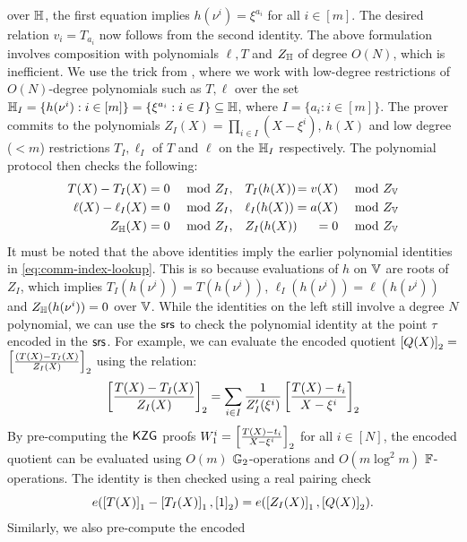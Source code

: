 over $\mathbb{H}$, the first equation implies $h(\nu^i)=\xi^{a_i}$ for all $i\in [m]$. The desired relation $v_i=T_{a_i}$ now follows from the second identity.
The above formulation involves composition with polynomials $\ell,T$ and $Z_\mathbb{H}$ of degree $O(N)$, which is inefficient. We use the trick from
\cite{CCS:ZBKMNS22,EPRINT:PosKat22}, where we work with low-degree restrictions of $O(N)$-degree polynomials such as $T, \ell$ over the set
$\mathbb{H}_I=\{{h(\nu^i)}: i\in [m]\}=\{\xi^{a_i}:i\in I\}\subseteq \mathbb{H}$, where $I=\{a_i: i\in [m]\}$. The prover
commits to the polynomials $Z_I(X)=\prod_{i\in I}(X-\xi^i)$, $h(X)$ and low degree ($<m$) restrictions $T_I, \ell_I$ of $T$ and $\ell$
on the $\mathbb{H}_I$ respectively. The polynomial protocol then checks the following:
\begin{equation}
    \begin{alignedat}{3}
        T(X) - T_I(X) &= 0 \quad \text{ mod } Z_I ,&\quad& T_I(h(X)) &= v(X) \quad \text{ mod } Z_{\mathbb{V}} \\
        \ell(X) - \ell_I(X) &= 0 \quad \text{ mod } Z_I ,&\quad& \ell_I(h(X)) &= a(X) \quad \text{ mod } Z_{\mathbb{V}} \\
        Z_{\mathbb{H}}(X) &= 0 \quad \text{ mod } Z_I ,&\quad& Z_I(h(X)) &= 0 \quad \text{ mod } Z_{\mathbb{V}}
    \end{alignedat}
    \label{eq:poly-comm-index}
\end{equation}
It must be noted that the above identities imply the earlier polynomial identities in \eqref{eq:comm-index-lookup}. This is so because evaluations
of $h$ on $\mathbb{V}$ are roots of $Z_I$, which implies $T_I(h(\nu^i))=T(h(\nu^i))$, $\ell_I(h(\nu^i))=\ell(h(\nu^i))$ and $Z_\mathbb{H}(h(\nu^i))=0$ over $\mathbb{V}$.
While the identities on the left still involve a degree $N$ polynomial, we can use the $\mathsf{srs}$ to check the polynomial
identity at the point $\tau$ encoded in the $\mathsf{srs}$. For example, we can evaluate the encoded quotient $\left[{Q(X)}\right]_2 =$
$\left[{\frac{(T(X) - T_I(X)}{Z_I(X)}}\right]_2$ using the relation:
\begin{equation*}
    \left[{\frac{T(X)-T_I(X)}{Z_I(X)}}\right]_2 = \sum_{i\in I}\frac{1}{Z_I'(\xi^i)}\left[{\frac{T(X)-t_i}{X-\xi^i}}\right]_2
\end{equation*}
By pre-computing the $\mathsf{KZG}$ proofs $W_1^i=\left[{\frac{T(X)-t_i}{X-\xi^i}}\right]_2$ for all $i\in [N]$, the encoded quotient can be
evaluated using $O(m)$ $\mathbb{G}_2$-operations and $O(m\log^2 m)$ $\mathbb{F}$-operations.
The identity is then checked using a real pairing check
$$e(\left[{T(X)}\right]_1-\left[{T_I(X)}\right]_1,\left[{1}\right]_2)=e(\left[{Z_I(X)}\right]_1,\left[{Q(X)}\right]_2).$$
Similarly, we also pre-compute the encoded
